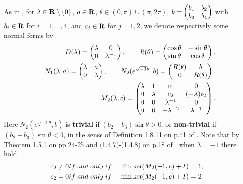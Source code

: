 \documentclass[11pt]{article}
\def\bea{\begin{eqnarray}}
\def\eea{\end{eqnarray}}
\def\nn{\nonumber}
\def\bs{\setminus}
\def\R{{\bf R}}
\def\th{{\theta}}
\def\lm{{\lambda}}
\begin{document}
As in \cite{Lon4}, for $\lm\in\R\bs\{0\}$, $a\in\R$, $\th\in (0,\pi)\cup (\pi,2\pi)$,
$b=\left(\begin{matrix}b_1 & b_2\cr
                 b_3 & b_4\cr\end{matrix}\right)$ with $b_i\in\R$ for $i=1, \ldots, 4$, and $c_j\in\R$
for $j=1, 2$, we denote respectively some normal forms by
\bea
&& D(\lm)=\left(\begin{matrix}\lm & 0\cr
                         0  & \lm^{-1}\cr\end{matrix}\right), \qquad
   R(\th)=\left(\begin{matrix}\cos\th & -\sin\th\cr
                        \sin\th  & \cos\th\cr\end{matrix}\right),  \nn\\
&& N_1(\lm, a)=\left(\begin{matrix}\lm & a\cr
                             0   & \lm\cr\end{matrix}\right), \qquad
   N_2(e^{\sqrt{-1}\th},b) = \left(\begin{matrix}R(\th) & b\cr
                                           0      & R(\th)\cr\end{matrix}\right),  \nn\\
&& M_2(\lm,c)=\left(\begin{matrix}\lm &   1 &       c_1 &         0 \cr
                              0 & \lm &       c_2 & (-\lm)c_2 \cr
                              0 &   0 &  \lm^{-1} &         0 \cr
                              0 &   0 & -\lm^{-2} &  \lm^{-1} \cr\end{matrix}\right). \nn\eea
Here $N_2(e^{\sqrt{-1}\th},b)$ is {\bf trivial} if $(b_2-b_3)\sin\th>0$, or {\bf non-trivial}
if $(b_2-b_3)\sin\th<0$, in the sense of Definition 1.8.11 on p.41 of \cite{Lon4}. Note that
by Theorem 1.5.1 on pp.24-25 and (1.4.7)-(1.4.8) on p.18 of \cite{Lon4}, when $\lm=-1$ there hold
\bea
c_2 \not= 0 &{\rm if\;and\;only\;if}\;& \dim\ker(M_2(-1,c)+I)=1, \nn\\
c_2 = 0 &{\rm if\;and\;only\;if}\;& \dim\ker(M_2(-1,c)+I)=2. \nn\eea
\end{document}
